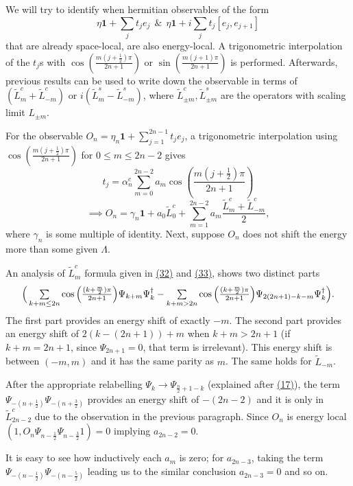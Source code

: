 \documentclass[twoside,11pt,titlepage]{amsart}
\renewcommand{\=}[1]{\stackrel{#1}{=}} %
\theoremstyle{definition}
\theoremstyle{remark}
\begin{document}
\hfill \break
We will try to identify when hermitian observables of the form 
$$\eta\textbf{1}+\sum_j t_je_j \ \ \& \ \ \eta\textbf{1}+i\sum_j t_j [e_j,e_{j+1}]$$
that are already space-local, are also energy-local. A trigonometric interpolation of the $t_j$s with $\cos(\frac{m(j+\frac{1}{2})\pi}{2n+1})$ or $\sin(\frac{m(j+1)\pi}{2n+1})$ is performed. Afterwards, previous results can be used to write down the observable in terms of $(\widetilde{L}_m^c+\widetilde{L}_{-m}^c)$ or $i(\widetilde{L}_{m}^s-\widetilde{L}_{-m}^s)$, where $\widetilde{L}_{\pm m}^{c},\widetilde{L}_{\pm m}^{s}$ are the operators with scaling limit $L_{\pm m}$.

For the observable $O_n=\eta_n\textbf{1}+\sum_{j=1}^{2n-1} t_je_j$, a trigonometric interpolation using $\cos(\frac{m(j+\frac{1}{2})\pi}{2n+1})$ for $0 \le m \le 2n-2$ gives
$$t_j= \alpha_n^c\sum_{m=0}^{2n-2} a_m\cos(\frac{m(j+\frac{1}{2})\pi}{2n+1})$$         
$$\implies O_n=\gamma_n\textbf{1}+a_0\widetilde{L}_0^c+\sum_{m=1}^{2n-2} a_m\frac{\widetilde{L}_m^c+\widetilde{L}_{-m}^c}{2},$$
where $\gamma_n$ is some multiple of identity. Next, suppose $O_n$ does not shift the energy more than some given $\Lambda$.

An analysis of $\widetilde{L}_m^c$ formula given in \hyperref[eq32]{(32)} and \hyperref[eq33]{(33)}, shows two distinct parts
\begin{gather*}
\scalebox{0.99}{$\Big(\sum\limits_{k+m \le 2n} \cos\Big(\frac{(k+\frac{m}{2})\pi}{2n+1}\Big) \Psi_{k+m}\Psi_{k}^\dagger-\sum\limits_{k+m>2n} \cos\Big(\frac{(k+\frac{m}{2})\pi}{2n+1}\Big)\Psi_{2(2n+1)-k-m}\Psi_{k}^\dagger \Big).$}
\end{gather*}
The first part provides an energy shift of exactly $-m$. The second part provides an energy shift of $2(k-(2n+1))+m$ when $k+m > 2n+1$ (if $k+m=2n+1$, since $\Psi_{2n+1}=0$, that term is irrelevant). This energy shift is between $(-m,m)$ and it has the same parity as $m$. The same holds for $\widetilde{L}_{-m}$.

After the appropriate relabelling $\Psi_k \rightarrow \Psi_{\frac{n}{2}+1-k}$ (explained after \hyperref[eq17]{(17)}), the term $\Psi_{-(n+\frac{1}{2})}\Psi_{-(n+\frac{3}{2})}$ provides an energy shift of $-(2n-2)$ and it is only in $\widetilde{L}_{2n-2}^c$ due to the observation in the previous paragraph. Since $O_n$ is energy local $(1,O_n\Psi_{n-\frac{1}{2}}\Psi_{n-\frac{3}{2}}1) = 0$ implying $a_{2n-2}=0$.

It is easy to see how inductively each $a_m$ is zero; for $a_{2n-3}$, taking the term $\Psi_{-(n-\frac{1}{2})}\Psi_{-(n-\frac{5}{2})}$ leading us to the similar conclusion $a_{2n-3}=0$ and so on.
\end{document}
